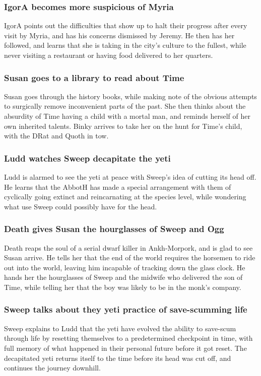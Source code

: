 \subsubsection{\Gls{IgorA} becomes more suspicious of \Gls{Myria}}
\Gls{IgorA} points out the difficulties that show up to halt their progress after every visit by
\Gls{Myria}, and has his concerns dismissed by \Gls{Jeremy}. He then has her followed, and learns
that she is taking in the city's culture to the fullest, while never visiting a restaurant or having
food delivered to her quarters.

\subsubsection{\Gls{Susan} goes to a library to read about \Gls{Time}}
\Gls{Susan} goes through the history books, while making note of the obvious attempts to surgically
remove inconvenient parts of the past. She then thinks about the absurdity of \Gls{Time} having a
child with a mortal man, and reminds herself of her own inherited talents. \Gls{Binky} arrives to
take her on the hunt for \Gls{Time}'s child, with the \Gls{DRat} and \Gls{Quoth} in tow.

\subsubsection{\Gls{Ludd} watches \Gls{Sweep} decapitate the yeti}
\Gls{Ludd} is alarmed to see the yeti at peace with \Gls{Sweep}'s idea of cutting its head off.
He learns that the \Gls{AbbotH} has made a special arrangement with them of cyclically going
extinct and reincarnating at the species level, while wondering what use \Gls{Sweep} could possibly
have for the head.

\subsubsection{\Gls{Death} gives \Gls{Susan} the hourglasses of \Gls{Sweep} and \Gls{Ogg}}
\Gls{Death} reaps the soul of a serial dwarf killer in Ankh-Morpork, and is glad to see \Gls{Susan}
arrive. He tells her that the end of the world requires the horsemen to ride out into the world,
leaving him incapable of tracking down the glass clock. He hands her the hourglasses of \Gls{Sweep}
and the midwife who delivered the son of \Gls{Time}, while telling her that the boy was likely to
be in the monk's company.

\subsubsection{\Gls{Sweep} talks about they yeti practice of save-scumming life}
\Gls{Sweep} explains to \Gls{Ludd} that the yeti have evolved the ability to save-scum through
life by resetting themselves to a predetermined checkpoint in time, with full memory of what
happened in their personal future before it got reset. The decapitated yeti returns itself to the
time before its head was cut off, and continues the journey downhill.


